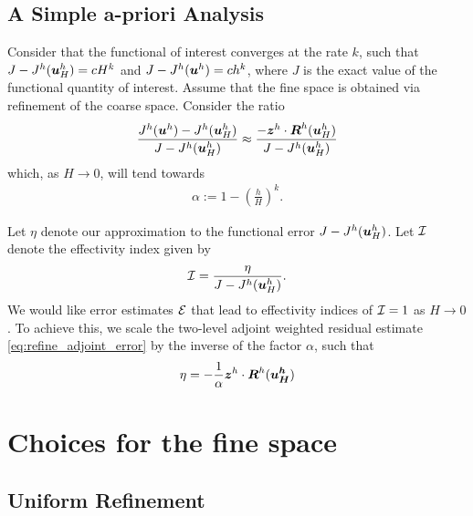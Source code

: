 \subsection{A Simple a-priori Analysis}

Consider that the functional of interest
converges at the rate $k$, such that
$J - J^h(\boldsymbol{u}^h_H) = c H^k$ and
$J - J^h(\boldsymbol{u}^h) = c h^k$,
where $J$ is the exact value of the functional
quantity of interest. Assume that the fine space
is obtained via refinement of the coarse space.
Consider the ratio
%
\begin{gather}
\frac{J^h(\boldsymbol{u}^h) - J^h(\boldsymbol{u}^h_H)}
{J - J^h(\boldsymbol{u}^h_H)} \approx
\frac{ - \boldsymbol{z}^h \cdot \boldsymbol{R}^h(\boldsymbol{u}^h_H)}
{J - J^h(\boldsymbol{u}^h_H)}
\end{gather}
%
which, as $H \to 0$, will tend towards \cite{fidkowski2011review}
%
\begin{gather}
\alpha := 1 - \left( \frac{h}{H} \right)^k.
\label{eq:refine_alpha}
\end{gather}
%

Let $\eta$ denote our approximation to the
functional error $J - J^h(\boldsymbol{u}^h_H)$.
Let $\mathcal{I}$ denote the effectivity index
given by
%
\begin{gather}
\mathcal{I} = \frac{\eta}{J - J^h(\boldsymbol{u}^h_H)}.
\label{eq:refine_effectivity}
\end{gather}
%
We would like error estimates
$\mathcal{E}$ that lead to effectivity indices of
$\mathcal{I} = 1$ as $H \to 0$. To achieve this, we scale
the two-level adjoint weighted residual estimate
\eqref{eq:refine_adjoint_error} by the inverse
of the factor $\alpha$, such that
%
\begin{gather}
\eta = - \frac{1}{\alpha}
\boldsymbol{z}^h \cdot \boldsymbol{R}^h(\boldsymbol{u^h_H})
\label{eq:refine_error_approx}
\end{gather}

\section{Choices for the fine space}

\subsection{Uniform Refinement}

